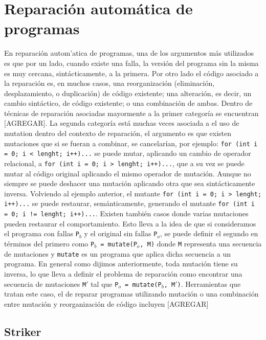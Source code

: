 \chapter[Reparaci\'on]{Reparaci\'on autom\'atica de programas}
\label{sec:preliminares.repair}

En reparaci\'on autom'atica de programas, una de los argumentos m\'as utilizados es que por un lado, cuando existe una falla, la versi\'on del programa sin la misma es muy cercana, sint\'acticamente, a la primera. Por otro lado el c\'odigo asociado a la reparaci\'on es, en muchos casos, una reorganizaci\'on (eliminaci\'on, desplazamiento, o duplicaci\'on) de c\'odigo existente; una alteraci\'on, es decir, un cambio sint\'actico, de c\'odigo existente; o una combinaci\'on de ambas. Dentro de t\'ecnicas de reparaci\'on asociadas mayormente a la primer categor\'ia se encuentran [AGREGAR]. La segunda categor\'ia est\'a muchas veces asociada a el uso de mutation dentro del contexto de reparaci\'on, el argumento es que existen mutaciones que si se fueran a combinar, se cancelar\'ian, por ejemplo:
\lstinline|for (int i = 0; i < lenght; i++)...| se puede mutar, aplicando un cambio de operador relacional, a \lstinline|for (int i = 0; i > lenght; i++)...|, que a su vez se puede mutar al c\'odigo original aplicando el mismo operador de mutaci\'on. Aunque no siempre se puede deshacer una mutaci\'on aplicando otra que sea sint\'acticamente inversa. Volviendo al ejemplo anterior, el mutante \lstinline|for (int i = 0; i > lenght; i++)...| se puede restaurar, sem\'anticamente, generando el mutante \lstinline|for (int i = 0; i != lenght; i++)...|. Existen tambi\'en casos donde varias mutaciones pueden restaurar el comportamiento. Esto lleva a la idea de que si consideramos el programa con fallas \texttt{P$_b$} y el original sin fallas \texttt{P$_o$}, se puede definir el segundo en t\'erminos del primero como \texttt{P$_b$ = mutate(P$_o$, M)} donde \texttt{M} representa una secuencia de mutaciones y \texttt{mutate} es un programa que aplica dicha secuencia a un programa. En general como dijimos anteriormente, toda mutaci\'on tiene su inversa, lo que lleva a definir el problema de reparaci\'on como encontrar una secuencia de mutaciones \texttt{M$\prime$} tal que \texttt{P$_o$ = mutate(P$_b$, M$\prime$)}. Herramientas que tratan este caso, el de reparar programas utilizando mutaci\'on o una combinaci\'on entre mutaci\'on y reorganizaci\'on de c\'odigo incluyen [AGREGAR]

\section{Striker}
\label{sec:preliminares.repair.striker}